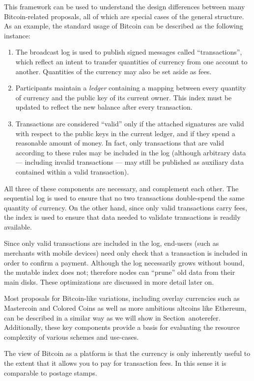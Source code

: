 This framework can be used to understand the design differences between many Bitcoin-related proposals, all of which are special cases of the general structure. As an example, the standard usage of Bitcoin can be described as the following instance:
\begin{enumerate}
\item The broadcast log is used to publish signed messages called ``transactions'', which reflect an intent to transfer quantities of currency from one account to another. Quantities of the currency may also be set aside as fees.
\item Participants maintain a \emph{ledger} containing a mapping between every quantity of currency and the public key of its current owner. This index must be updated to reflect the new balance after every transaction.
\item Transactions are considered ``valid'' only if the attached signatures are valid with respect to the public keys in the current ledger, and if they spend a reasonable amount of money. In fact, only transactions that are valid according to these rules may be included in the log (although arbitrary data --- including invalid transactions --- may still be published as auxiliary data contained within a valid transaction).
\end{enumerate}
All three of these components are necessary, and complement each other. The sequential log is used to ensure that no two transactions double-spend the same quantity of currency. On the other hand, since only valid transactions carry fees, the index is used to ensure that data needed to validate transactions is readily available.

Since only valid transactions are included in the log, end-users (such as merchants with mobile devices) need only check that a transaction is included in order to confirm a payment. Although the log necessarily grows without bound, the mutable index does not; therefore nodes can ``prune'' old data from their main disks. These optimizations are discussed in more detail later on.

Most proposals for Bitcoin-like variations, including overlay currencies such as Mastercoin and Colored Coins as well as more ambitious altcoins like Ethereum, can be described in a similar way as we will show in Section~anote{refer}. Additionally, these key components provide a basis for evaluating the resource complexity of various schemes and use-cases.

The view of Bitcoin as a platform is that the currency is only inherently useful to the extent that it allows you to pay for transaction fees. In this sense it is comparable to postage stamps.


